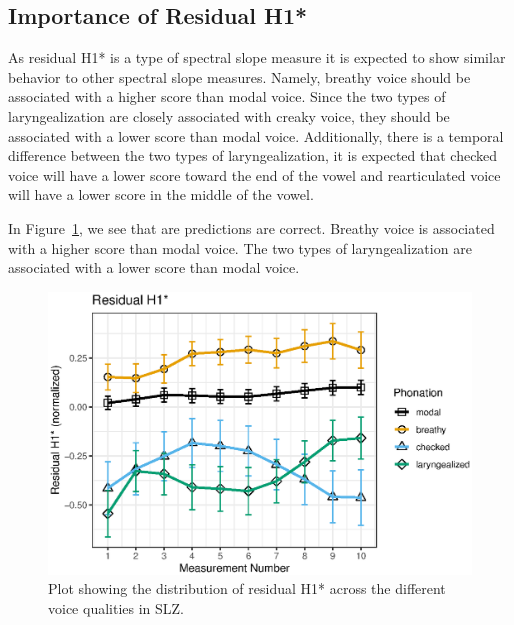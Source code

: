 \subsection{Importance of Residual H1*} \label{sec:bagging_residual}
As residual H1* is a type of spectral slope measure it is expected to show similar behavior to other spectral slope measures. Namely, breathy voice should be associated with a higher score than modal voice. Since the two types of laryngealization are closely associated with creaky voice, they should be associated with a lower score than modal voice. Additionally, there is a temporal difference between the two types of laryngealization, it is expected that checked voice will have a lower score toward the end of the vowel and  rearticulated voice will have a lower score in the middle of the vowel. 

In Figure~\ref{fig:residualH1}, we see that are predictions are correct. Breathy voice is associated with a higher score than modal voice. The two types of laryngealization are associated with a lower score than modal voice.

\begin{figure}[!ht]
    \centering
    \includegraphics[width = 0.9\linewidth]{images/slz_residual_h1c.eps}
    \caption{Plot showing the distribution of residual H1* across the different voice qualities in SLZ.}
    \label{fig:residualH1}
\end{figure}

